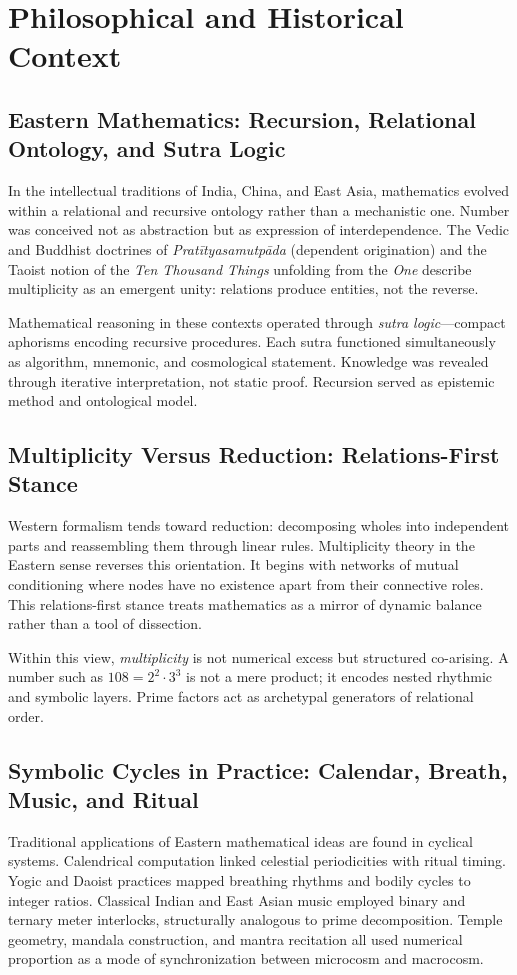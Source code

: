 \documentclass[12pt]{article}
\numberwithin{equation}{section}
\theoremstyle{plain}
\theoremstyle{definition}
\theoremstyle{remark}
\begin{document}
\section*{Philosophical and Historical Context}

\subsection*{Eastern Mathematics: Recursion, Relational Ontology, and Sutra Logic}
In the intellectual traditions of India, China, and East Asia, mathematics evolved within a relational and recursive ontology rather than a mechanistic one. Number was conceived not as abstraction but as expression of interdependence. The Vedic and Buddhist doctrines of \emph{Pratītyasamutpāda} (dependent origination) and the Taoist notion of the \emph{Ten Thousand Things} unfolding from the \emph{One} describe multiplicity as an emergent unity: relations produce entities, not the reverse.

Mathematical reasoning in these contexts operated through \emph{sutra logic}—compact aphorisms encoding recursive procedures. Each sutra functioned simultaneously as algorithm, mnemonic, and cosmological statement. Knowledge was revealed through iterative interpretation, not static proof. Recursion served as epistemic method and ontological model.

\subsection*{Multiplicity Versus Reduction: Relations-First Stance}
Western formalism tends toward reduction: decomposing wholes into independent parts and reassembling them through linear rules. Multiplicity theory in the Eastern sense reverses this orientation. It begins with networks of mutual conditioning where nodes have no existence apart from their connective roles. This relations-first stance treats mathematics as a mirror of dynamic balance rather than a tool of dissection.

Within this view, \emph{multiplicity} is not numerical excess but structured co-arising. A number such as \(108=2^{2}\cdot3^{3}\) is not a mere product; it encodes nested rhythmic and symbolic layers. Prime factors act as archetypal generators of relational order.

\subsection*{Symbolic Cycles in Practice: Calendar, Breath, Music, and Ritual}
Traditional applications of Eastern mathematical ideas are found in cyclical systems. Calendrical computation linked celestial periodicities with ritual timing. Yogic and Daoist practices mapped breathing rhythms and bodily cycles to integer ratios. Classical Indian and East Asian music employed binary and ternary meter interlocks, structurally analogous to prime decomposition. Temple geometry, mandala construction, and mantra recitation all used numerical proportion as a mode of synchronization between microcosm and macrocosm.
\end{document}
